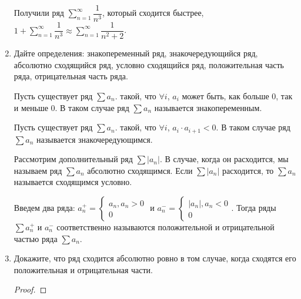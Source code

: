 \documentclass[a4paper]{article}
\begin{document}
\begin{enumerate}
\begin{example}
            Получили ряд $\sum_{n = 1}^{\infty} \dfrac{1}{n^3}$, который сходится быстрее, $1 + \sum_{n = 1}^{\infty} \dfrac{1}{n^3} \approx \sum_{n = 1}^{\infty} \dfrac{1}{n^2 + 2}$.
        \end{example}
    
   		\item Дайте определения: знакопеременный ряд, знакочередующийся ряд, абсолютно сходящийся ряд, условно сходящийся ряд, положительная часть ряда, отрицательная часть ряда.
    
    	\begin{definition}
    		Пусть существует ряд $\sum a_n$. такой, что $\forall i$, $a_i$ может быть, как больше 0, так и меньше 0. В таком случае ряд $\sum a_n$ называется знакопеременным.
    	\end{definition}
    		
    	\begin{definition}
    		Пусть существует ряд $\sum a_n$. такой, что $\forall i$, $a_i \cdot a_{i+1} < 0$. В таком случае ряд $\sum a_n$ называется знакочередующимся.
    	\end{definition}
    
    	\begin{definition}
    		Рассмотрим дополнительный ряд $\sum |a_n|$. В случае, когда он расходится, мы называем ряд $\sum a_n$ абсолютно сходящимся. Если $\sum |a_n|$ расходится, то $\sum a_n$ называется сходящимся условно.
   		\end{definition}
   	
   		\begin{definition}
   			Введем два ряда: $a_n^+ = \begin{cases}
   			a_n, a_n > 0 \\
   			0
   			\end{cases}$ 
   			и $a_n^- = \begin{cases}
   			|a_n|, a_n < 0 \\
   			0
   			\end{cases}$.
   			Тогда ряды $\sum a_n^+$ и $a_n^-$ соответственно называются положительной и отрицательной частью ряда $\sum a_n$.
   		\end{definition}
   	
   		\item Докажите, что ряд сходится абсолютно ровно в том случае, когда сходятся его положительная и отрицательная части.
   			
   		\begin{proof}
   		

\end{proof}
\end{enumerate}
\end{document}

